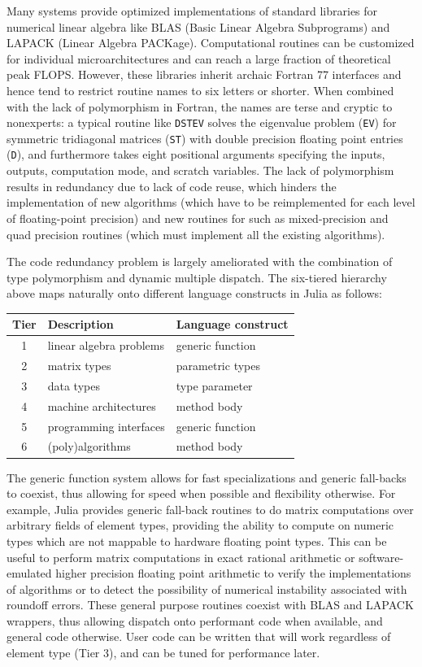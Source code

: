 \documentclass[10pt, preprint]{sigplanconf}
\begin{document}
Many systems provide optimized implementations of standard libraries for
numerical linear algebra like BLAS (Basic Linear Algebra Subprograms) and
LAPACK (Linear Algebra PACKage). Computational routines can be customized
for individual microarchitectures and can reach a large fraction of
theoretical peak FLOPS. However, these libraries inherit archaic Fortran 77
interfaces and hence tend to restrict routine names to six letters or shorter.
When combined with the lack of polymorphism in Fortran, the names are terse and
cryptic to nonexperts: a typical routine like \verb|DSTEV| solves the
eigenvalue problem (\verb|EV|) for symmetric tridiagonal matrices (\verb|ST|)
with double precision floating point entries (\verb|D|), and furthermore takes
eight positional arguments specifying the inputs, outputs, computation mode,
and scratch variables. The lack of polymorphism results in redundancy due to
lack of code reuse, which hinders the implementation of new algorithms (which
have to be reimplemented for each level of floating-point precision) and new
routines for such as mixed-precision and quad precision routines (which must
implement all the existing algorithms).

The code redundancy problem is largely ameliorated with the combination of type
polymorphism and dynamic multiple dispatch. The six-tiered hierarchy above maps
naturally onto different language constructs in Julia as follows:

\vspace{12pt}
\begin{tabular}{c l l}
	\hline
	Tier & Description & Language construct \\ \hline
	1 & linear algebra problems & generic function \\
	2 & matrix types & parametric types \\
	3 & data types & type parameter \\
	4 & machine architectures & method body \\
	5 & programming interfaces & generic function \\
	6 & (poly)algorithms & method body \\ \hline
\end{tabular}
\vspace{12pt}

The generic function system allows for fast specializations and generic
fall-backs to coexist, thus allowing for speed when possible and flexibility
otherwise. For example, Julia provides generic fall-back routines to do matrix
computations over arbitrary fields of element types, providing the ability to
compute on numeric types which are not mappable to hardware floating point
types. This can be useful to perform matrix computations in exact rational
arithmetic or software-emulated higher precision floating point arithmetic to
verify the implementations of algorithms or to detect the possibility of
numerical instability associated with roundoff errors. These general purpose
routines coexist with BLAS and LAPACK wrappers, thus allowing dispatch onto
performant code when available, and general code otherwise. User code can be
written that will work regardless of element type (Tier 3), and can be tuned
for performance later.
\end{document}
